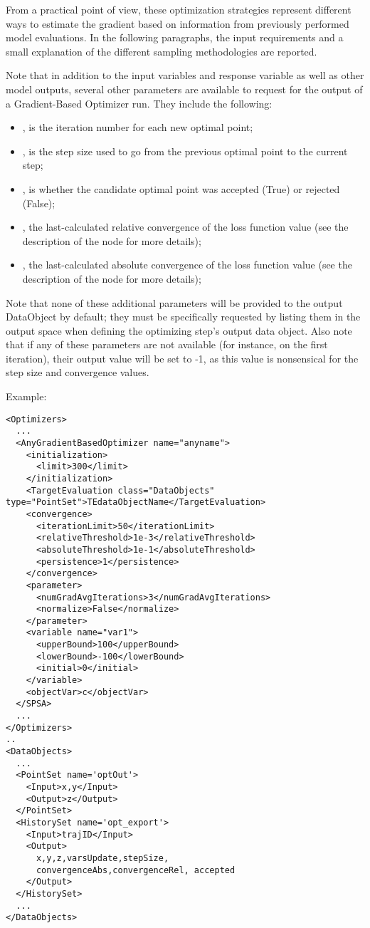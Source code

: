 From a practical point of view, these optimization strategies represent different ways to estimate the gradient based on information
from previously performed model evaluations. In the following paragraphs, the input requirements and a small explanation of the
different sampling methodologies are reported.

Note that in addition to the input variables and response variable as well as other model outputs, several
other parameters are available to
request for the output of a Gradient-Based Optimizer run.  They include the following:
\begin{itemize}
  \item {}, is the iteration number for each new optimal point;
  \item {}, is the step size used to go from the previous optimal point to the current step;
  \item {}, is whether the candidate optimal point was accepted (True) or rejected (False);
  \item {}, the last-calculated relative convergence of the loss function value
    (see the description of the  node for more details);
  \item {}, the last-calculated absolute convergence of the loss function value
    (see the description of the  node for more details);
\end{itemize}
Note that none of these additional parameters will be provided to the output DataObject by default; they must
be specifically requested by listing them in the output space when defining the optimizing step's output data
object.  Also note that if any of these parameters are not available (for instance, on the first iteration),
their output value will be set to -1, as this value is nonsensical for the step size and convergence values.

Example:
\begin{lstlisting}[style=XML]
<Optimizers>
  ...
  <AnyGradientBasedOptimizer name="anyname">
    <initialization>
      <limit>300</limit>
    </initialization>
    <TargetEvaluation class="DataObjects" type="PointSet">TEdataObjectName</TargetEvaluation>
    <convergence>
      <iterationLimit>50</iterationLimit>
      <relativeThreshold>1e-3</relativeThreshold>
      <absoluteThreshold>1e-1</absoluteThreshold>
      <persistence>1</persistence>
    </convergence>
    <parameter>
      <numGradAvgIterations>3</numGradAvgIterations>
      <normalize>False</normalize>
    </parameter>
    <variable name="var1">
      <upperBound>100</upperBound>
      <lowerBound>-100</lowerBound>
      <initial>0</initial>
    </variable>
    <objectVar>c</objectVar>
  </SPSA>
  ...
</Optimizers>
..
<DataObjects>
  ...
  <PointSet name='optOut'>
    <Input>x,y</Input>
    <Output>z</Output>
  </PointSet>
  <HistorySet name='opt_export'>
    <Input>trajID</Input>
    <Output>
      x,y,z,varsUpdate,stepSize,
      convergenceAbs,convergenceRel, accepted
    </Output>
  </HistorySet>
  ...
</DataObjects>
\end{lstlisting}

